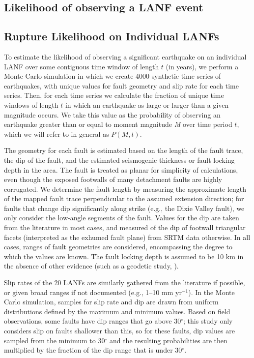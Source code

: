 \documentclass[twocolumn,grl]{AGUTeX}
\begin{document}
\begin{article}
\section{Likelihood of observing a LANF event}
\subsection{Rupture Likelihood on Individual LANFs}
To estimate the likelihood of observing a significant earthquake on an
individual LANF over some contiguous time window of length $t$ (in
years), we perform a Monte Carlo simulation in which we create 4000
synthetic time series of earthquakes, with unique values for fault
geometry and slip rate for each time series. Then, for each time
series we calculate the fraction of unique time windows of length $t$
in which an earthquake as large or larger than a given magnitude
occurs.  We take this value as the probability of observing an
earthquake greater than or equal to moment magnitude \emph{M} over
time period $t$, which we will refer to in general as $P(M,t)$.

The geometry for each fault is estimated based on the length of the
fault trace, the dip of the fault, and the estimated seismogenic
thickness or fault locking depth in the area.  The fault is treated as
planar for simplicity of calculations, even though the exposed
footwalls of many detachment faults are highly corrugated.  We
determine the fault length by measuring the approximate length of the
mapped fault trace perpendicular to the assumed extension direction;
for faults that change dip significantly along strike (e.g., the Dixie
Valley fault), we only consider the low-angle segments of the fault.
Values for the dip are taken from the literature in most cases, and
measured of the dip of footwall triangular facets (interpreted as the exhumed
fault plane) from SRTM data otherwise. In all cases, ranges of fault
geometries are considered, encompassing the degree to which the values are 
known. The fault locking depth is assumed to be 10 km in the absence of other
evidence (such as a geodetic study, \citep[e.g.,][]{hreinsdottir2009altotib}).

Slip rates of the 20 LANFs are similarly gathered from the
literature if possible, or given broad ranges if not documented
(e.g., 1--10 mm yr$^{-1}$).  In the Monte Carlo simulation, samples
for slip rate and dip are drawn from uniform distributions defined
by the maximum and minimum values.  Based on field observations,
some faults have dip ranges that go above 30$^\circ$; this study
only considers slip on faults shallower than this, so for these
faults, dip values are sampled from the minimum to 30$^\circ$ and
the resulting probabilities are then multiplied by the fraction of
the dip range that is under 30$^\circ$.


\end{article}
\end{document}
